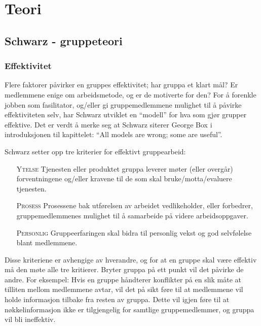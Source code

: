 \chapter{Teori}
\fancyhead[LE]{\thepage\hspace{2em}\footnotesize{\rightmark}}
\fancyhead[RE,LO]{\thesection}
\fancyhead[RO]{{\footnotesize\leftmark}\hspace{2em}\thepage}

\section{Schwarz - gruppeteori}
\label{sec:schwarz}
\subsection{Effektivitet}

Flere faktorer påvirker en gruppes effektivitet; har gruppa et klart mål? Er
medlemmene enige om arbeidsmetode, og er de motiverte for den? For å forenkle
jobben som fasilitator, og/eller gi gruppemedlemmene mulighet til å påvirke
effektiviteten selv, har Schwarz utviklet en ``modell'' for hva som gjør grupper
effektive. Det er verdt å merke seg at Schwarz siterer George Box i
introduksjonen til kapittelet: ``All models are wrong; some are useful''.

Schwarz setter opp tre kriterier for effektivt gruppearbeid:

\begin{itemize}
\item[\textsc{Ytelse}] Tjenesten eller produktet gruppa leverer møter (eller overgår)
	forventningene og/eller kravene til de som skal bruke/motta/evaluere
	tjenesten.
\item[\textsc{Prosess}] Prosessene bak utførelsen av arbeidet vedlikeholder, eller
forbedrer, gruppemedlemmenes mulighet til å samarbeide på videre
arbeidsoppgaver.
\item[\textsc{Personlig}] Gruppeerfaringen skal bidra til personlig vekst og god
selvfølelse blant medlemmene.
\end{itemize}

Disse kriteriene er avhengige av hverandre, og for at en gruppe skal være
effektiv må den møte alle tre kritierer. Bryter gruppa på ett punkt vil det
påvirke de andre. For eksempel: Hvis en gruppe håndterer konflikter på en slik
måte at tilliten mellom medlemmene avtar, vil det på sikt føre til at medlemmene
vil holde informasjon tilbake fra resten av gruppa. Dette vil igjen føre til at
nøkkelinformasjon ikke er tilgjengelig for samtlige gruppemedlemmer, og gruppa
vil bli ineffektiv.

